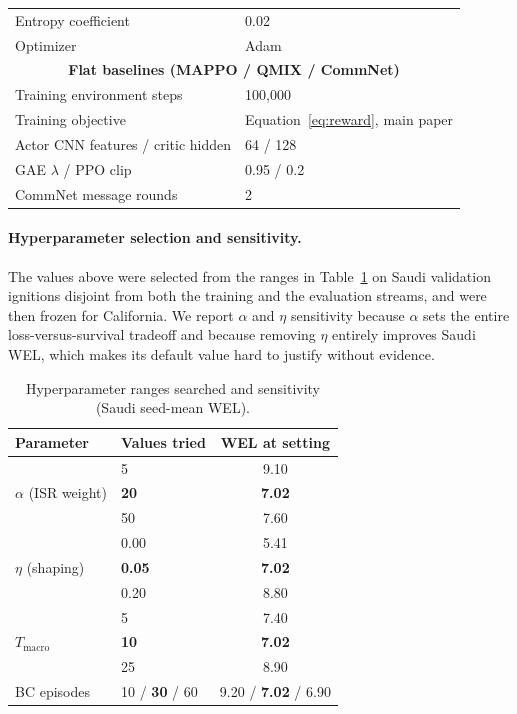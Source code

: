 \documentclass[letterpaper]{article}
\begin{document}
\begin{table}[H]
\begin{tabular}{ll}
		Entropy coefficient & 0.02 \\
		Optimizer & Adam \\
		\midrule
		\multicolumn{2}{c}{\textbf{Flat baselines (MAPPO / QMIX / CommNet)}} \\
		Training environment steps & 100,000 \\
		Training objective & Equation~\ref{eq:reward}, main paper \\
		Actor CNN features / critic hidden & 64 / 128 \\
		GAE $\lambda$ / PPO clip & 0.95 / 0.2 \\
		CommNet message rounds & 2 \\
		\bottomrule
	\end{tabular}
\end{table}

\paragraph{Hyperparameter selection and sensitivity.} The values above were selected from the ranges in Table~\ref{tab:sensitivity} on Saudi validation ignitions disjoint from both the training and the evaluation streams, and were then frozen for California. We report $\alpha$ and $\eta$ sensitivity because $\alpha$ sets the entire loss-versus-survival tradeoff and because removing $\eta$ entirely improves Saudi WEL, which makes its default value hard to justify without evidence.

\begin{table}[H]
	\centering
	\caption{Hyperparameter ranges searched and sensitivity (Saudi seed-mean WEL).}
	\label{tab:sensitivity}
	\small
	\begin{tabular}{llc}
		\toprule
		Parameter & Values tried & WEL at setting \\
		\midrule
		\multirow{3}{*}{$\alpha$ (ISR weight)} & 5 & 9.10 \\
		& \textbf{20} & \textbf{7.02} \\
		& 50 & 7.60 \\
		\midrule
		\multirow{3}{*}{$\eta$ (shaping)} & 0.00 & 5.41 \\
		& \textbf{0.05} & \textbf{7.02} \\
		& 0.20 & 8.80 \\
		\midrule
		\multirow{3}{*}{$T_{\text{macro}}$} & 5 & 7.40 \\
		& \textbf{10} & \textbf{7.02} \\
		& 25 & 8.90 \\
		\midrule
		BC episodes & 10 / \textbf{30} / 60 & 9.20 / \textbf{7.02} / 6.90 \\
		\bottomrule
	\end{tabular}
\end{table}
\end{document}
